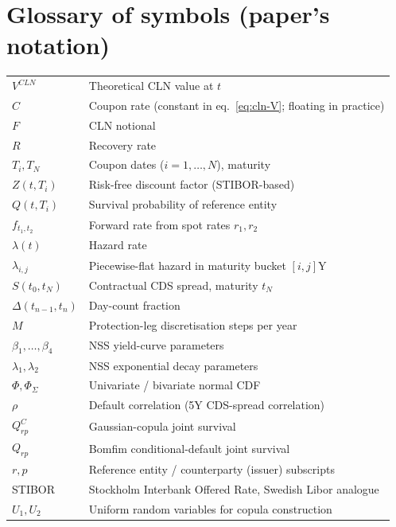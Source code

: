 \documentclass[11pt,a4paper]{article}
\begin{document}
\section{Glossary of symbols (paper's notation)}
\begin{tabular}{@{}p{3cm}p{12cm}@{}}
\toprule
$V^{CLN}$                  & Theoretical CLN value at $t$ \\
$C$                        & Coupon rate (constant in eq.~\ref{eq:cln-V}; floating in practice) \\
$F$                        & CLN notional \\
$R$                        & Recovery rate \\
$T_i, T_N$                 & Coupon dates ($i = 1, \ldots, N$), maturity \\
$Z(t, T_i)$                & Risk-free discount factor (STIBOR-based) \\
$Q(t, T_i)$                & Survival probability of reference entity \\
$f_{t_1, t_2}$             & Forward rate from spot rates $r_1, r_2$ \\
$\lambda(t)$               & Hazard rate \\
$\lambda_{i,j}$            & Piecewise-flat hazard in maturity bucket $[i, j]$Y \\
$S(t_0, t_N)$              & Contractual CDS spread, maturity $t_N$ \\
$\Delta(t_{n-1}, t_n)$     & Day-count fraction \\
$M$                        & Protection-leg discretisation steps per year \\
$\beta_1, \ldots, \beta_4$ & NSS yield-curve parameters \\
$\lambda_1, \lambda_2$     & NSS exponential decay parameters \\
$\Phi, \Phi_\Sigma$        & Univariate / bivariate normal CDF \\
$\rho$                     & Default correlation (5Y CDS-spread correlation) \\
$Q^C_{rp}$                 & Gaussian-copula joint survival \\
$Q_{rp}$                   & Bomfim conditional-default joint survival \\
$r, p$                     & Reference entity / counterparty (issuer) subscripts \\
STIBOR                     & Stockholm Interbank Offered Rate, Swedish Libor analogue \\
$U_1, U_2$                 & Uniform random variables for copula construction \\
\bottomrule
\end{tabular}
\end{document}
